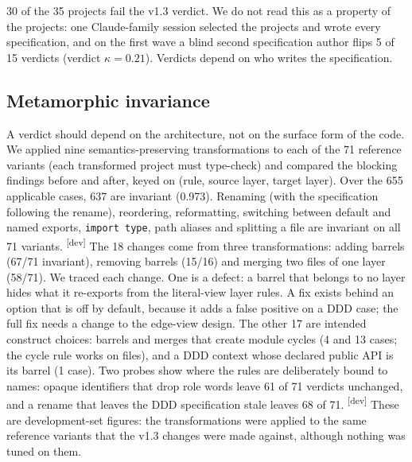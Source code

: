 \documentclass[10pt,a4paper]{article}
\newcommand{\devset}{\textsuperscript{\textsf{\tiny[dev]}}}
\begin{document}
30 of the 35 projects fail the v1.3 verdict. We do not read this as a property of the projects: one Claude-family
session selected the projects and wrote every specification, and on the first wave a blind second specification
author flips 5 of 15 verdicts (verdict $\kappa = 0.21$). Verdicts depend on who writes the specification.

\subsection{Metamorphic invariance}\label{sec:v13-metamorphic}

A verdict should depend on the architecture, not on the surface form of the code. We applied nine
semantics-preserving transformations to each of the 71 reference variants (each transformed project must
type-check) and compared the blocking findings before and after, keyed on (rule, source layer, target layer).
Over the 655 applicable cases, 637 are invariant (0.973). Renaming (with the specification following the rename),
reordering, reformatting, switching between default and named exports, \texttt{import type}, path aliases and
splitting a file are invariant on all 71 variants. \devset{}
The 18 changes come from three transformations: adding barrels (67/71 invariant), removing barrels (15/16) and
merging two files of one layer (58/71). We traced each change. One is a defect: a barrel that belongs to no layer
hides what it re-exports from the literal-view layer rules. A fix exists behind an option that is off by default,
because it adds a false positive on a DDD case; the full fix needs a change to the edge-view design. The other 17
are intended construct choices: barrels and merges that create module cycles (4 and 13 cases; the cycle rule works
on files), and a DDD context whose declared public API is its barrel (1 case). Two probes show where the rules are
deliberately bound to names: opaque identifiers that drop role words leave 61 of 71 verdicts unchanged, and a
rename that leaves the DDD specification stale leaves 68 of 71. \devset{}
These are development-set figures: the transformations were applied to the same reference variants that the v1.3
changes were made against, although nothing was tuned on them.
\end{document}
